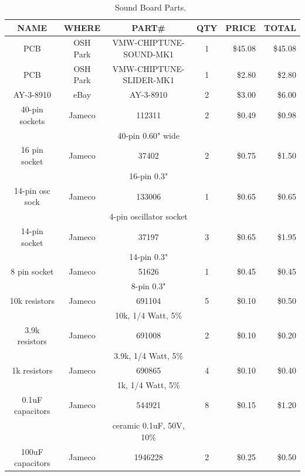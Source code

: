 \documentclass[11pt]{article}
\begin{document}
\begin{table}
\caption{Sound Board Parts.~\label{table:sound_parts}}
\centering
\begin{tabular}{|c|c|c|c|r|r|}
\hline
NAME		& WHERE		& PART\#                  & QTY	& PRICE	   & TOTAL \\
\hline
\hline
PCB		& OSH Park	& VMW-CHIPTUNE-SOUND-MK1  & 1	& \$45.08  & \$45.08 \\
\hline
PCB		& OSH Park	& VMW-CHIPTUNE-SLIDER-MK1 & 1   &  \$2.80  &  \$2.80 \\
\hline
AY-3-8910	& eBay		& AY-3-8910		  & 2	&  \$3.00  &  \$6.00 \\
\hline
40-pin sockets	& Jameco	& 112311		  & 2	&  \$0.49  &  \$0.98 \\
		&		& 40-pin 0.60" wide       &     &	   &         \\
\hline
16 pin socket	& Jameco	& 37402                   & 2	&  \$0.75  &  \$1.50 \\
		&		& 16-pin 0.3"		  &     &          &         \\
\hline
14-pin osc sock	& Jameco	& 133006	          & 1	&  \$0.65  &  \$0.65 \\
		&		& 4-pin oscillator socket &     &	   &	     \\
\hline
14-pin socket	& Jameco	& 37197			  & 3	&  \$0.65  &  \$1.95 \\
		&		& 14-pin 0.3"		  &     &          &         \\
\hline
8 pin socket	& Jameco	& 51626                   & 1	&  \$0.45  &  \$0.45 \\
		&		& 8-pin 0.3"              &     &          &         \\
\hline
10k resistors	& Jameco	& 691104		  & 5   &  \$0.10  &  \$0.50 \\
		&		& 10k, 1/4 Watt, 5\%	  &     &          &         \\
\hline
3.9k resistors	& Jameco	& 691008		  & 2   &  \$0.10  &  \$0.20 \\
		&		& 3.9k, 1/4 Watt, 5\%	  &     &          &         \\
\hline
1k resistors	& Jameco	& 690865		  & 4   &  \$0.10  &  \$0.40 \\
		&		& 1k, 1/4 Watt, 5\%	  &     &          &         \\
\hline
0.1uF capacitors& Jameco	& 544921		  & 8   &  \$0.15  &  \$1.20 \\
		&		& ceramic 0.1uF, 50V, 10\%&     &          &         \\
\hline
100uF capacitors& Jameco	& 1946228		  & 2   &  \$0.25  &  \$0.50 \\

\end{tabular}
\end{table}
\end{document}
